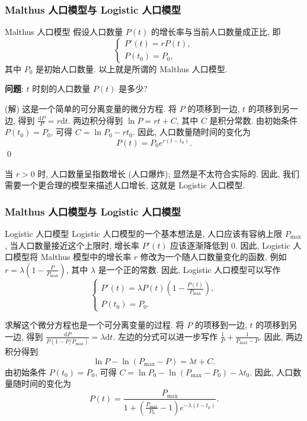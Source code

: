 
\begin{frame}
\frametitle{Malthus 人口模型与 Logistic 人口模型}

\begin{block}{Malthus 人口模型}
假设人口数量 $P(t)$ 的增长率与当前人口数量成正比, 即
\[
\begin{cases}
P'(t) = r P(t), \\
P(t_0) = P_0,
\end{cases}
\]
其中 $P_0$ 是初始人口数量. 以上就是所谓的 Malthus 人口模型.

\pause

\textbf{问题}: $t$ 时刻的人口数量 $P(t)$ 是多少?
\end{block}

\startproof[bg=yellow, fg=red](解)
这是一个简单的可分离变量的微分方程. 将 $P$ 的项移到一边, $t$ 的项移到另一边, 得到 $\frac{\mathrm{d}P}{P} = r \mathrm{d}t$. 两边积分得到 $\ln P = rt + C$, 其中 $C$ 是积分常数. 由初始条件 $P(t_0) = P_0$, 可得 $C = \ln P_0 - rt_0$. 因此, 人口数量随时间的变化为
\[
P(t) = P_0 e^{r(t - t_0)}.
\]
\qed

\pause

当 $r > 0$ 时, 人口数量呈指数增长 (人口爆炸); 显然是不太符合实际的. 因此, 我们需要一个更合理的模型来描述人口增长, 这就是 Logistic 人口模型.

\end{frame}


\begin{frame}
\frametitle{Malthus 人口模型与 Logistic 人口模型}

\begin{block}{Logistic 人口模型}
Logistic 人口模型的一个基本想法是, 人口应该有容纳上限 $P_{\max}$, 当人口数量接近这个上限时, 增长率 $P'(t)$ 应该逐渐降低到 $0$. 因此, Logistic 人口模型将 Malthus 模型中的增长率 $r$ 修改为一个随人口数量变化的函数, 例如 $r = \lambda \left(1 - \frac{P}{P_{\max}}\right)$, 其中 $\lambda$ 是一个正的常数. 因此, Logistic 人口模型可以写作
\[
\begin{cases}
P'(t) = \lambda P(t) \left(1 - \frac{P(t)}{P_{\max}}\right), \\
P(t_0) = P_0.
\end{cases}
\]
\end{block}

\pause

求解这个微分方程也是一个可分离变量的过程. 将 $P$ 的项移到一边, $t$ 的项移到另一边, 得到 $\frac{\mathrm{d}P}{P(1 - P/P_{\max})} = \lambda \mathrm{d}t$. 左边的分式可以进一步写作 $\frac{1}{P} + \frac{1}{P_{\max} - P}$. 因此, 两边积分得到
\[
\ln P - \ln (P_{\max} - P) = \lambda t + C.
\]
由初始条件 $P(t_0) = P_0$, 可得 $C = \ln P_0 - \ln (P_{\max} - P_0) - \lambda t_0$. 因此, 人口数量随时间的变化为
\[
P(t) = \frac{P_{\max}}{1 + \left(\frac{P_{\max}}{P_0} - 1\right) e^{-\lambda (t - t_0)}}.
\]

\end{frame}



